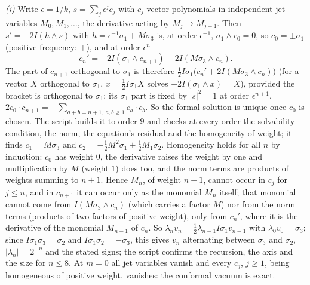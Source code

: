\emph{(i)} Write $\epsilon = 1/k$, $s = \sum_{j}\epsilon^{j}c_{j}$ with $c_{j}$ vector polynomials in independent jet variables $M_{0}, M_{1}, \dots$, the derivative acting by $M_{j} \mapsto M_{j+1}$. Then $s' = -2I(h\wedge s)$ with $h = \epsilon^{-1}\sigma_{1} + M\sigma_{3}$ is, at order $\epsilon^{-1}$, $\sigma_{1}\wedge c_{0} = 0$, so $c_{0} = \pm\sigma_{1}$ (positive frequency: $+$), and at order $\epsilon^{n}$
\[
c_{n}' = -2I(\sigma_{1}\wedge c_{n+1}) - 2I(M\sigma_{3}\wedge c_{n}).
\]
The part of $c_{n+1}$ orthogonal to $\sigma_{1}$ is therefore $\tfrac12I\sigma_{1}\bigl(c_{n}' + 2I(M\sigma_{3}\wedge c_{n})\bigr)$ (for a vector $X$ orthogonal to $\sigma_{1}$, $x = \tfrac12I\sigma_{1}X$ solves $-2I(\sigma_{1}\wedge x) = X$), provided the bracket is orthogonal to $\sigma_{1}$; its $\sigma_{1}$ part is fixed by $|s|^{2} = 1$ at order $\epsilon^{n+1}$, $2c_{0}\cdot c_{n+1} = -\sum_{a + b = n+1,\ a,b \ge 1}c_{a}\cdot c_{b}$. So the formal solution is unique once $c_{0}$ is chosen. The script builds it to order $9$ and checks at every order the solvability condition, the norm, the equation's residual and the homogeneity of weight; it finds $c_{1} = M\sigma_{3}$ and $c_{2} = -\tfrac12M^{2}\sigma_{1} + \tfrac12M_{1}\sigma_{2}$. Homogeneity holds for all $n$ by induction: $c_{0}$ has weight $0$, the derivative raises the weight by one and multiplication by $M$ (weight $1$) does too, and the norm terms are products of weights summing to $n + 1$. Hence $M_{n}$, of weight $n + 1$, cannot occur in $c_{j}$ for $j \le n$, and in $c_{n+1}$ it can occur only as the monomial $M_{n}$ itself; that monomial cannot come from $I(M\sigma_{3}\wedge c_{n})$ (which carries a factor $M$) nor from the norm terms (products of two factors of positive weight), only from $c_{n}'$, where it is the derivative of the monomial $M_{n-1}$ of $c_{n}$. So $\lambda_{n}v_{n} = \tfrac12\lambda_{n-1}I\sigma_{1}v_{n-1}$ with $\lambda_{0}v_{0} = \sigma_{3}$; since $I\sigma_{1}\sigma_{3} = \sigma_{2}$ and $I\sigma_{1}\sigma_{2} = -\sigma_{3}$, this gives $v_{n}$ alternating between $\sigma_{3}$ and $\sigma_{2}$, $|\lambda_{n}| = 2^{-n}$ and the stated signs; the script confirms the recursion, the axis and the size for $n \le 8$. At $m = 0$ all jet variables vanish and every $c_{j}$, $j \ge 1$, being homogeneous of positive weight, vanishes: the conformal vacuum is exact.

